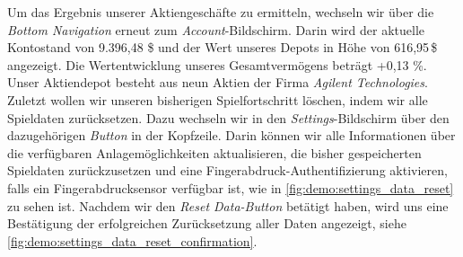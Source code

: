 \documentclass[a4paper]{article}
\begin{document}
Um das Ergebnis unserer Aktiengeschäfte zu ermitteln, wechseln wir über die \textit{Bottom Navigation} erneut zum \textit{Account}-Bildschirm.
Darin wird der aktuelle Kontostand von 9.396,48 \$ und der Wert unseres Depots in Höhe von 616,95\,\$ angezeigt.
Die Wertentwicklung unseres Gesamtvermögens beträgt +0,13 \%.
Unser Aktiendepot besteht aus neun Aktien der Firma \textit{Agilent Technologies}.\newline
Zuletzt wollen wir unseren bisherigen Spielfortschritt löschen, indem wir alle Spieldaten zurücksetzen.
Dazu wechseln wir in den \textit{Settings}-Bildschirm über den dazugehörigen \textit{Button} in der Kopfzeile.
Darin können wir alle Informationen über die verfügbaren Anlagemöglichkeiten aktualisieren, die bisher gespeicherten Spieldaten zurückzusetzen und eine Fingerabdruck-Authentifizierung aktivieren, falls ein Fingerabdrucksensor verfügbar ist, wie in \autoref{fig:demo:settings_data_reset} zu sehen ist.
Nachdem wir den \textit{Reset Data-Button} betätigt haben, wird uns eine Bestätigung der erfolgreichen Zurücksetzung aller Daten angezeigt, siehe \autoref{fig:demo:settings_data_reset_confirmation}.
\end{document}
